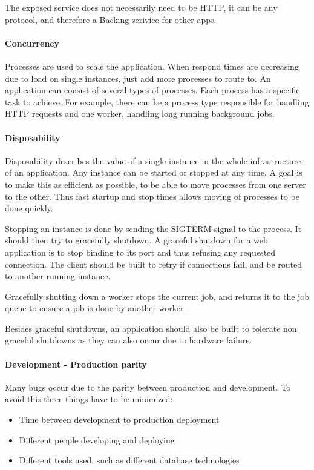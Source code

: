 The exposed service does not necessarily need to be HTTP, it can be any
protocol, and therefore a Backing serivice for other apps.

\paragraph{Concurrency}

Processes are used to scale the application. When respond times are decreasing
due to load on single instances, just add more processes to route to. An
application can consist of several types of processes. Each process has a
specific task to achieve. For example, there can be a process type responsible
for handling HTTP requests and one worker, handling long running background
jobs.

\paragraph{Disposability}

Disposability describes the value of a single instance in the whole
infrastructure of an application. Any instance can be started or stopped at any
time. A goal is to make this as efficient as possible, to be able to move
processes from one server to the other. Thus fast startup and stop times allows
moving of processes to be done quickly.

Stopping an instance is done by sending the SIGTERM signal to the process. It
should then try to gracefully shutdown. A graceful shutdown for a web
application is to stop binding to its port and thus refusing any requested
connection. The client should be built to retry if connections fail, and be
routed to another running instance.

Gracefully shutting down a worker stops the current job, and returns it to the
job queue to ensure a job is done by another worker.

Besides graceful shutdowns, an application should also be built to tolerate non
graceful shutdowns as they can also occur due to hardware failure.

\paragraph{Development - Production parity}

Many bugs occur due to the parity between production and development. To avoid
this three things have to be minimized:

\begin{itemize}
  \item{Time between development to production deployment}
  \item{Different people developing and deploying}
  \item{Different tools used, such as different database technologies}
\end{itemize}

